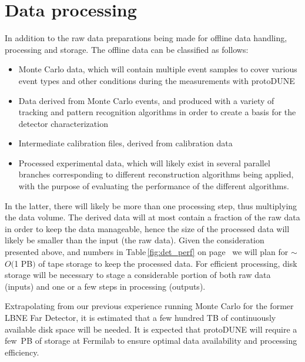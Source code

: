 \documentclass[12pt]{article}
\begin{document}
\section{Data processing}
\label{sec:protodune-dataprocess}

In addition to the raw data preparations being made for offline data handling, processing and storage.
The offline data can be classified as follows:
\begin{itemize}
\item Monte Carlo data, which will contain multiple event samples to cover various event types and other conditions during the measurements
with protoDUNE

\item Data derived from Monte Carlo events, and produced with a variety of tracking and pattern recognition algorithms
in order to create a basis for the detector characterization

\item Intermediate calibration files, derived from calibration data

\item Processed experimental data, which will likely exist in several parallel branches corresponding to different reconstruction
algorithms being applied, with the purpose of evaluating the performance of the different algorithms.
\end{itemize}

\noindent In the latter, there will likely be more than one processing step, thus multiplying the data volume. 
The derived data will at most contain a fraction of the raw data in order to keep the data manageable,
hence the size of the processed data will likely be smaller than the input (the raw data). 
Given the consideration presented above, and numbers in Table\,\ref{fig:det_perf}
on page~\pageref{fig:det_perf} we will plan for
$\sim$ $O($1 PB$)$ of tape storage to keep the processed data. 
For efficient processing, disk storage will be necessary
to stage a considerable portion of both raw data (inputs) and one or a few steps in processing (outputs).

Extrapolating from our previous experience running Monte Carlo for the former LBNE Far Detector, it is estimated
that  a few hundred TB of continuously available disk space will be needed. It is expected that protoDUNE will require
a few~PB of storage at Fermilab to ensure optimal data availability and  processing efficiency. 
\end{document}
